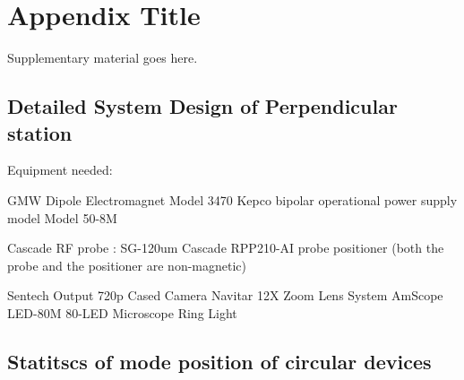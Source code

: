
\appendix
\chapter{Appendix Title}

Supplementary material goes here.

\section{Detailed System Design of Perpendicular station}



Equipment needed:

GMW Dipole Electromagnet Model 3470
Kepco bipolar operational power supply model Model 50-8M 

Cascade RF probe : SG-120um
Cascade RPP210-AI probe positioner
(both the probe and the positioner are non-magnetic)

Sentech Output 720p Cased Camera
Navitar 12X Zoom Lens System
AmScope LED-80M 80-LED Microscope Ring Light




\section{Statitscs of mode position of circular devices}




